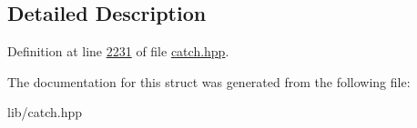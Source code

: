 \subsection{Detailed Description}


Definition at line \mbox{\hyperlink{catch_8hpp_source_l02231}{2231}} of file \mbox{\hyperlink{catch_8hpp_source}{catch.\+hpp}}.



The documentation for this struct was generated from the following file\+:\begin{DoxyCompactItemize}
\item 
lib/catch.\+hpp\end{DoxyCompactItemize}
